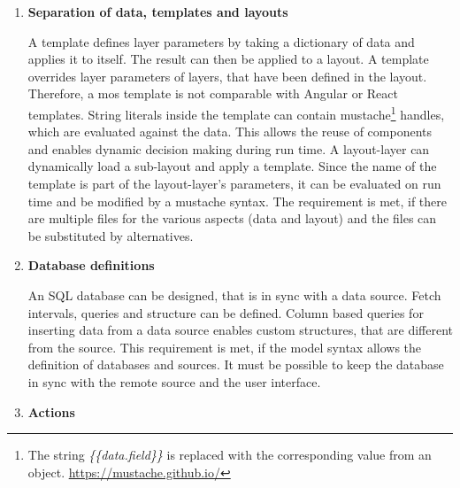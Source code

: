 \begin{enumerate}
	An example that enables a React\footnote{Reactive and functional UI framework. \url{https://reactjs.org/}}-like behavior is the \textit{layout layer}.
	It's parameters are an \ac{SQL} query, a layout name and a template name.
	The layer runs the query and applies the data to the template, and the template to the layout and displays the layout.
	If one of the tables that are selected in the query changes, the \textit{layout layer} re-renders itself.
	
	This requirement is fulfilled, if there are no illegal application states, that do not fit the configuration.
	That means that if a layer is configured to get it's value from a specific source and the layer changes it's value, the source must be changed automatically.
	
	\item \textbf{Separation of data, templates and layouts}
	
	A template defines layer parameters by taking a dictionary of data and applies it to itself.
	The result can then be applied to a layout.
	A template overrides layer parameters of layers, that have been defined in the layout.
	Therefore, a mos template is not comparable with Angular or React templates.
	String literals inside the template can contain mustache\footnote{The string \textit{\{\{data.field\}\}} is replaced with the corresponding value from an object. \url{https://mustache.github.io/}} handles, which are evaluated against the data.
	This allows the reuse of components and enables dynamic decision making during run time.
	A layout-layer can dynamically load a sub-layout and apply a template.
	Since the name of the template is part of the layout-layer's parameters, it can be evaluated on run time and be modified by a mustache syntax.
	The requirement is met, if there are multiple files for the various aspects (data and layout) and the files can be substituted by alternatives.
	
	\item \textbf{Database definitions}
	
	An \ac{SQL} database can be designed, that is in sync with a data source.
	Fetch intervals, queries and structure can be defined.
	Column based queries for inserting data from a data source enables custom structures, that are different from the source.
	This requirement is met, if the model syntax allows the definition of databases and sources.
	It must be possible to keep the database in sync with the remote source and the user interface.
	
	\item \textbf{Actions}
	

\end{enumerate}

